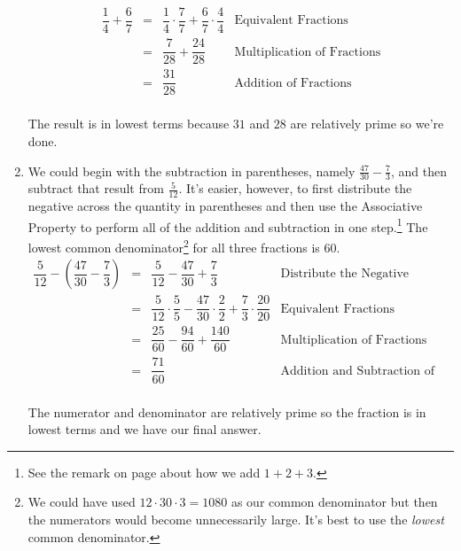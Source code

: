 \begin{ex}
\begin{enumerate}
\[\begin{array}{rclr}
\dfrac{1}{4} + \dfrac{6}{7} & = & \dfrac{1}{4} \cdot \dfrac{7}{7} + \dfrac{6}{7} \cdot \dfrac{4}{4} &  \text{Equivalent Fractions} \\ [10pt]
                                           & = & \dfrac{7}{28}  + \dfrac{24}{28} & \text{Multiplication of Fractions}\\ [10pt]
																					 & = & \dfrac{31}{28}                  & \text{Addition of Fractions} \\ \end{array} \]

The result is in lowest terms because $31$ and $28$ are relatively prime so we're done.


\item  We could begin with the subtraction in parentheses, namely $\frac{47}{30} - \frac{7}{3}$, and then subtract that result from $\frac{5}{12}$.  It's easier, however, to first distribute the negative across the quantity in parentheses and then use the Associative Property to perform all of the addition and subtraction in one step.\footnote{See the remark on page \pageref{howtoaddonetwothree} about how we add $1 + 2 + 3$.}  The lowest common denominator\footnote{We could have used $12 \cdot 30 \cdot 3 = 1080$ as our common denominator but then the numerators would become unnecessarily large.  It's best to use the \emph{lowest} common denominator.} for all three fractions is $60$.\[ \begin{array}{rclr}

\dfrac{5}{12} - \left(\dfrac{47}{30} - \dfrac{7}{3}\right) & = & \dfrac{5}{12} - \dfrac{47}{30} + \dfrac{7}{3} & \text{Distribute the Negative}\\ [10pt]
& = & \dfrac{5}{12} \cdot \dfrac{5}{5} - \dfrac{47}{30} \cdot \dfrac{2}{2} + \dfrac{7}{3} \cdot \dfrac{20}{20} & \text{Equivalent Fractions}\\ [10pt]
& = & \dfrac{25}{60} - \dfrac{94}{60} + \dfrac{140}{60} & \text{Multiplication of Fractions} \\ [10pt]
& = & \dfrac{71}{60} & \text{Addition and Subtraction of Fractions} \\ \end{array}\]

The numerator and denominator are relatively prime so the fraction is in lowest terms and we have our final answer.



\end{enumerate}
\end{ex}
